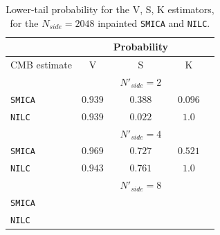 \begin{table}
\centering
\caption{Lower-tail probability for the V, S, K estimators, for the $N_{side} = 2048$ inpainted \texttt{SMICA} and \texttt{NILC}.}
\label{table:1}
\begin{tabular}{@{}lcccc}
\hline 
  & & Probability & \\
\hline  
CMB estimate & V & S & K \\ 
\hline  
 & & $N'_{side}=2$ & \\
\texttt{SMICA} & $0.939$ & $0.388$ & $0.096$ \\ 
\texttt{NILC} & $0.939$ & $0.022$ & $1.0$  \\
 & & $ N'_{side} = 4 $ & \\
\texttt{SMICA} & $ 0.969 $ & $ 0.727 $ & $ 0.521 $ \\
\texttt{NILC} & $ 0.943 $ & $ 0.761 $ & $ 1.0 $ \\ 
 & & $N'_{side} = 8$ & \\
\texttt{SMICA} & $ $ & $ $ & $ $ \\
\texttt{NILC} & $ $ & $ $ & $ $ \\
\hline
\end{tabular} 
\end{table}

